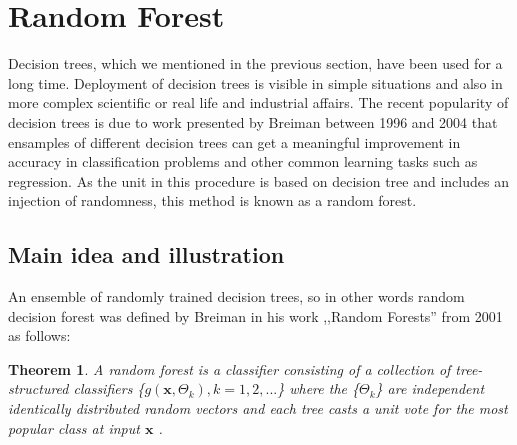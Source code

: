 \section{Random Forest}
Decision trees, which we mentioned in the previous section, have been used for a long time. Deployment of decision trees is visible in simple situations and also in more complex scientific or real life and industrial affairs. The recent popularity of decision trees is due to work presented by Breiman between 1996 and 2004 that ensamples of different decision trees can get a meaningful improvement in accuracy in classification problems and other common learning tasks such as regression. As the unit in this procedure is based on decision tree and includes an injection of randomness, this method is known as a random forest. 

\subsection{Main idea and illustration}
An ensemble of randomly trained decision trees, so in other words random decision forest was defined by Breiman in his work ,,Random Forests”  from 2001 as follows:


\newtheorem{theorem}{Theorem}
\begin{theorem}
A random forest is a classifier consisting of a collection of tree-structured classifiers \{${g(\textbf{x},\Theta_{k})}, k = 1,2,...$\} where the \{$\Theta_{k}$\} are independent identically
distributed random vectors and each tree casts a unit vote for the most popular class at input $\textbf{x}$ .
\end{theorem}

